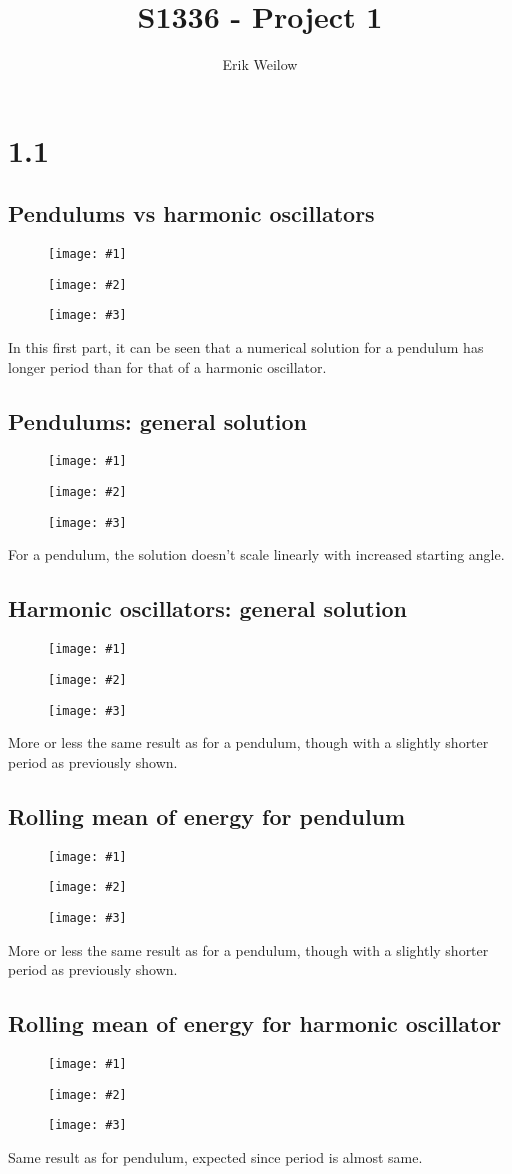 \documentclass[11pt]{article}
\title{S1336 - Project 1}%
\author{Erik Weilow} %
\newcommand{\triplefigure}[3]{
\begin{figure}[H]
  \centering
  \begin{minipage}{0.3\linewidth}
    \centering
    \texttt{[image: \#1]}
  \end{minipage}
  \begin{minipage}{0.3\linewidth}
    \centering
    \texttt{[image: \#2]}
  \end{minipage}
  \begin{minipage}{0.3\linewidth}
    \centering
    \texttt{[image: \#3]}
  \end{minipage}
\end{figure}
}
\begin{document}
\maketitle

\section{1.1}

\subsection{Pendulums vs harmonic oscillators}
\triplefigure{./plots/1_1/comparison_1.png}{./plots/1_1/comparison_2.png}{./plots/1_1/comparison_3.png}
In this first part, it can be seen that a numerical solution for a pendulum has longer period than for that of a harmonic oscillator.

\subsection{Pendulums: general solution}
\triplefigure{./plots/1_1/sol_pendulum_1.png}{./plots/1_1/sol_pendulum_2.png}{./plots/1_1/sol_pendulum_3.png}
For a pendulum, the solution doesn't scale linearly with increased starting angle. 

\subsection{Harmonic oscillators: general solution}
\triplefigure{./plots/1_1/sol_harmonic_1.png}{./plots/1_1/sol_harmonic_2.png}{./plots/1_1/sol_harmonic_3.png}
More or less the same result as for a pendulum, though with a slightly shorter period as previously shown. 

\subsection{Rolling mean of energy for pendulum}
\triplefigure{./plots/1_1/rollingMean_1.png}{./plots/1_1/rollingMean_2.png}{./plots/1_1/rollingMean_3.png}
More or less the same result as for a pendulum, though with a slightly shorter period as previously shown. 

\subsection{Rolling mean of energy for harmonic oscillator}
\triplefigure{./plots/1_1/rollingMean_harmonic_1.png}{./plots/1_1/rollingMean_harmonic_2.png}{./plots/1_1/rollingMean_harmonic_3.png}
Same result as for pendulum, expected since period is almost same.


\end{document}
